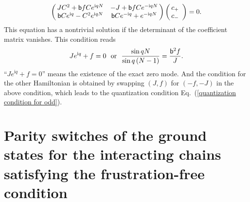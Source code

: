 \documentclass[aps, prb, showpacs, twocolumn, %
amssymb,superscriptaddress]{revtex4}
\newcommand{\ii}{\text{i}}
\begin{document}
\begin{equation}
\left( \begin{array}{@{\,}cc@{\,}}
	J C^{2} + {\sf b} f C e^{\ii qN} & - J + {\sf b} f C e^{-\ii qN} \\
	{\sf b} C e^{\ii q} - C^{2} e^{\ii qN} & {\sf b} C e^{-\ii q} + e^{-\ii qN} \\
	\end{array} \right) \left( \begin{array}{@{\,}cc@{\,}}  c_{+} \\ c_{-} \\ \end{array} \right) = 0.
\end{equation}
This equation has a nontrivial solution if the determinant of the coefficient matrix vanishes. This condition reads
\begin{equation}
Je^{\ii q} + f = 0~~\mathrm{or}~~\frac{\sin qN}{\sin q \left( N-1 \right)} = \frac{{\sf b}^{2}f}{J}.
\end{equation}
``$Je^{\ii q} + f = 0$'' means the existence of the exact zero mode. And the condition for the other Hamiltonian is obtained by swapping $( J,f )$ for $( -f, -J )$ in the above condition, which leads to the quantization condition Eq.~(\ref{quantization condition for odd}).


\section{Parity switches of the ground states for the interacting chains satisfying the frustration-free condition}
\label{sec:frustration-free}
\end{document}

